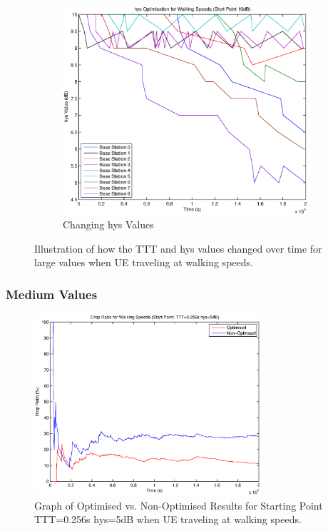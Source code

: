 \begin{figure}[H]
\begin{subfigure}[b]{0.49\textwidth}
                \includegraphics[width=\textwidth]{figures/walking_figures/high/long_hys.eps}
                \caption{Changing hys Values}
                \label{fig:walk_high_hys}
        \end{subfigure}
        \caption{Illustration of how the TTT and hys values changed over time for large values when UE traveling at walking speeds.}\label{fig:walk_high_ttthys}
\end{figure}

\subsubsection*{Medium Values}
\begin{figure}[H]
  \begin{center}
    	  \includegraphics[width=0.75\textwidth]{figures/walking_figures/mid/long_drop.eps}
    \end{center}
    \caption{Graph of Optimised vs. Non-Optimised Results for Starting Point TTT=0.256s hys=5dB when UE traveling at walking speeds.}
    \label{fig:walk_mid_drop}
\end{figure}

